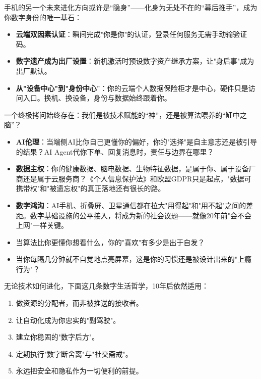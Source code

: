 手机的另一个未来进化方向或许是“隐身”——化身为无处不在的“幕后推手”，成为你数字身份的唯一基石：

\begin{itemize}
  \item \textbf{云端双因素认证}：瞬间完成"你是你"的认证，登录任何服务无需手动输验证码。
  \item \textbf{数字遗产成为出厂设置}：新机激活时预设数字资产继承方案，让"身后事"成为出厂默认。
  \item \textbf{从"设备中心"到"身份中心"}：你的云端个人数据保险柜才是中心，硬件只是访问入口。换机、换设备，身份与数据始终跟着你。
\end{itemize}


一个终极拷问始终存在：我们是被技术赋能的“神”，还是被算法喂养的“缸中之脑”？

\begin{itemize}
  \item \textbf{AI伦理}：当端侧AI比你自己更懂你的偏好，你的"选择"是自主意志还是被引导的结果？AI Agent代你下单、回复消息时，责任与边界在哪里？
  \item \textbf{数据主权}：你的健康数据、脑电数据、生物特征数据，是属于你、属于设备厂商还是属于云服务商？《个人信息保护法》和欧盟GDPR只是起点，"数据可携带权"和"被遗忘权"的真正落地还有很长的路。
  \item \textbf{数字鸿沟}：AI手机、折叠屏、卫星通信都在拉大"用得起"和"用不起"之间的差距。数字基础设施的公平接入，将成为新的社会议题——就像20年前"会不会上网"一样关键。
  \item 当算法比你更懂你想看什么，你的"喜欢"有多少是出于自发？
  \item 当你每隔几分钟就不自觉地点亮屏幕，这是你的习惯还是被设计出来的"上瘾行为"？
\end{itemize}


无论技术如何进化，下面这几条数字生活哲学，10年后依然适用：

\begin{enumerate}
  \item 做资源的分配者，而非被推送的接收者。
  \item 让自动化成为你忠实的"副驾驶"。
  \item 建立你稳固的"数字后方"。
  \item 定期执行"数字断舍离"与"社交斋戒"。
  \item 永远把安全和隐私作为一切便利的前提。
\end{enumerate}

